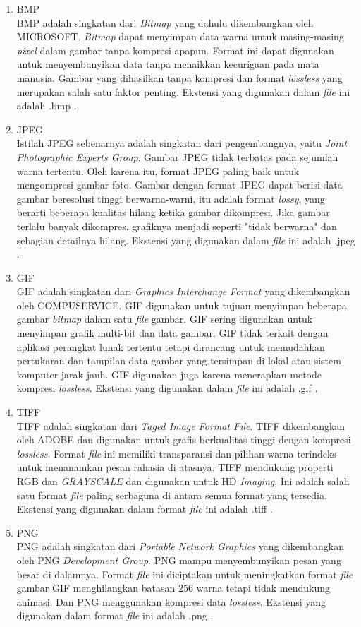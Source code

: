 		\begin{enumerate}
			\item BMP\\
			BMP adalah singkatan dari \emph{Bitmap} yang dahulu dikembangkan oleh MICROSOFT. \emph{Bitmap} dapat menyimpan data warna untuk masing-masing \emph{pixel} dalam gambar tanpa kompresi apapun. Format ini dapat digunakan untuk menyembunyikan data tanpa menaikkan kecurigaan pada mata manusia. Gambar yang dihasilkan tanpa kompresi dan format \emph{lossless} yang merupakan salah satu faktor penting. Ekstensi yang digunakan dalam \emph{file} ini adalah .bmp \cite{gautam}.
			\item JPEG\\
			Istilah JPEG sebenarnya adalah singkatan dari pengembangnya, yaitu \emph{Joint Photographic Experts Group}. Gambar JPEG tidak terbatas pada sejumlah warna tertentu. Oleh karena itu, format JPEG paling baik untuk mengompresi gambar foto. Gambar dengan format JPEG dapat berisi data gambar beresolusi tinggi berwarna-warni, itu adalah format \emph{lossy}, yang berarti beberapa kualitas hilang ketika gambar dikompresi. Jika gambar terlalu banyak dikompres, grafiknya menjadi seperti "tidak berwarna" dan sebagian detailnya hilang. Ekstensi yang digunakan dalam \emph{file} ini adalah .jpeg \cite{elgabar}.
			\item GIF\\
			GIF adalah singkatan dari \emph{Graphics Interchange Format} yang dikembangkan oleh COMPUSERVICE. GIF digunakan untuk tujuan menyimpan beberapa gambar \emph{bitmap} dalam satu \emph{file} gambar. GIF sering digunakan untuk menyimpan grafik multi-bit dan data gambar. GIF tidak terkait dengan aplikasi perangkat lunak tertentu tetapi dirancang untuk memudahkan pertukaran dan tampilan data gambar yang tersimpan di lokal atau sistem komputer jarak jauh. GIF digunakan juga karena menerapkan metode kompresi \emph{lossless}. Ekstensi yang digunakan dalam \emph{file} ini adalah .gif \cite{elgabar2}.
			\item TIFF\\
			TIFF adalah singkatan dari \emph{Taged Image Format File}. TIFF dikembangkan oleh ADOBE dan digunakan untuk grafis berkualitas tinggi dengan kompresi \emph{lossless}. Format \emph{file} ini memiliki transparansi dan pilihan warna terindeks untuk menanamkan pesan rahasia di atasnya. TIFF mendukung properti RGB dan \emph{GRAYSCALE} dan digunakan untuk HD \emph{Imaging}. Ini adalah salah satu format \emph{file} paling serbaguna di antara semua format yang tersedia. Ekstensi yang digunakan dalam format \emph{file} ini adalah .tiff \cite{gautam}.
			\item PNG\\
			PNG adalah singkatan dari \emph{Portable Network Graphics} yang dikembangkan oleh PNG \emph{Development Group}. PNG mampu menyembunyikan pesan yang besar di dalamnya. Format \emph{file} ini diciptakan untuk meningkatkan format \emph{file} gambar GIF menghilangkan batasan 256 warna tetapi tidak mendukung animasi. Dan PNG menggunakan kompresi data \emph{lossless}. Ekstensi yang digunakan dalam format \emph{file} ini adalah .png \cite{gautam}.
		\end{enumerate}
